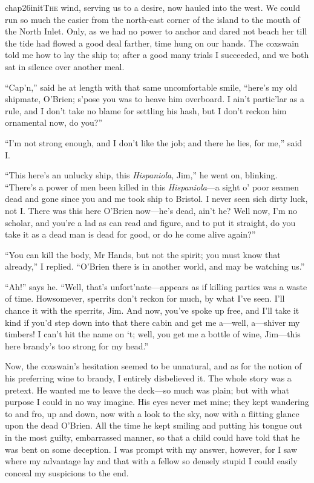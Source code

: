 
   \lettrine[lines=4,image=true]{chap26initT}{he} wind, serving us to a desire, now hauled into the west. We could run so much the easier from the north-east corner of the island to the mouth of the North Inlet. Only, as we had no power to anchor and dared not beach her till the tide had flowed a good deal farther, time hung on our hands. The coxswain told me how to lay the ship to; after a good many trials I succeeded, and we both sat in silence over another meal.

\enquote{Cap’n,} said he at length with that same uncomfortable smile, \enquote{here’s my old shipmate, O’Brien; s’pose you was to heave him overboard. I ain’t partic’lar as a rule, and I don’t take no blame for settling his hash, but I don’t reckon him ornamental now, do you?}

\enquote{I’m not strong enough, and I don’t like the job; and there he lies, for me,} said I.

\enquote{This here’s an unlucky ship, this \textit{Hispaniola}, Jim,} he went on, blinking. \enquote{There’s a power of men been killed in this \textit{Hispaniola}---a sight o’ poor seamen dead and gone since you and me took ship to Bristol. I never seen sich dirty luck, not I. There was this here O’Brien now---he’s dead, ain’t he? Well now, I’m no scholar, and you’re a lad as can read and figure, and to put it straight, do you take it as a dead man is dead for good, or do he come alive again?}

\enquote{You can kill the body, Mr Hands, but not the spirit; you must know that already,} I replied. \enquote{O’Brien there is in another world, and may be watching us.}

\enquote{Ah!} says he. \enquote{Well, that’s unfort’nate---appears as if killing parties was a waste of time. Howsomever, sperrits don’t reckon for much, by what I’ve seen. I’ll chance it with the sperrits, Jim. And now, you’ve spoke up free, and I’ll take it kind if you’d step down into that there cabin and get me a---well, a---shiver my timbers! I can’t hit the name on `t; well, you get me a bottle of wine, Jim---this here brandy’s too strong for my head.}

Now, the coxswain’s hesitation seemed to be unnatural, and as for the notion of his preferring wine to brandy, I entirely disbelieved it. The whole story was a pretext. He wanted me to leave the deck---so much was plain; but with what purpose I could in no way imagine. His eyes never met mine; they kept wandering to and fro, up and down, now with a look to the sky, now with a flitting glance upon the dead O’Brien. All the time he kept smiling and putting his tongue out in the most guilty, embarrassed manner, so that a child could have told that he was bent on some deception. I was prompt with my answer, however, for I saw where my advantage lay and that with a fellow so densely stupid I could easily conceal my suspicions to the end.

